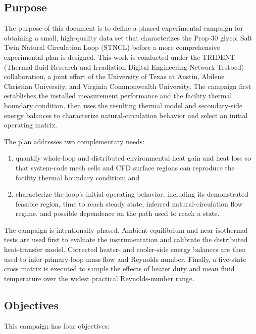 \documentclass[11pt]{article}
\begin{document}
\subsection{Purpose}
The purpose of this document is to define a phased experimental campaign for obtaining a small, high-quality data set that characterizes the Prop-30 glycol Salt Twin Natural Circulation Loop (STNCL) before a more comprehensive experimental plan is designed. This work is conducted under the \hbox{TRIDENT} (Thermal-fluid Research and Irradiation Digital Engineering Network Testbed) collaboration, a joint effort of the University of Texas at Austin, Abilene Christian University, and Virginia Commonwealth University. The campaign first establishes the installed measurement performance and the facility thermal boundary condition, then uses the resulting thermal model and secondary-side energy balances to characterize natural-circulation behavior and select an initial operating matrix.

The plan addresses two complementary needs:

\begin{enumerate}
    \item quantify whole-loop and distributed environmental heat gain and heat loss so that system-code mesh cells and CFD surface regions can reproduce the facility thermal boundary condition; and
    \item characterize the loop's initial operating behavior, including its demonstrated feasible region, time to reach steady state, inferred natural-circulation flow regime, and possible dependence on the path used to reach a state.
\end{enumerate}

The campaign is intentionally phased. Ambient-equilibrium and near-isothermal tests are used first to evaluate the instrumentation and calibrate the distributed heat-transfer model. Corrected heater- and cooler-side energy balances are then used to infer primary-loop mass flow and Reynolds number. Finally, a five-state cross matrix is executed to sample the effects of heater duty and mean fluid temperature over the widest practical Reynolds-number range.

\subsection{Objectives}
\label{sec:objectives}

This campaign has four objectives:
\end{document}
